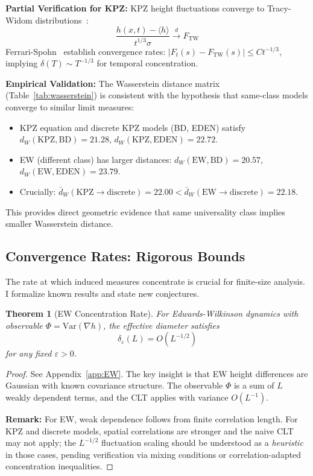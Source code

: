 \documentclass[aps,pre,reprint,amsmath,amssymb,superscriptaddress]{revtex4-2}
\newtheorem{theorem}{Theorem}
\newcommand{\EW}{\text{EW}}
\newcommand{\KPZ}{\text{KPZ}}
\begin{document}
\textbf{Partial Verification for KPZ:} KPZ height fluctuations converge to Tracy-Widom distributions~\cite{Johansson2000}:
\begin{equation}
\frac{h(x,t) - \langle h \rangle}{t^{1/3}\sigma} \xrightarrow{d} F_{\text{TW}}
\end{equation}
Ferrari-Spohn~\cite{FerrariSpohn2006} establish convergence rates: $|F_t(s) - F_{\text{TW}}(s)| \leq C t^{-1/3}$, implying $\delta(T) \sim T^{-1/3}$ for temporal concentration.

\textbf{Empirical Validation:} The Wasserstein distance matrix (Table~\ref{tab:wasserstein}) is consistent with the hypothesis that same-class models converge to similar limit measures:
\begin{itemize}
\item KPZ equation and discrete KPZ models (BD, EDEN) satisfy $d_W(\KPZ, \text{BD}) = 21.28$, $d_W(\KPZ, \text{EDEN}) = 22.72$.
\item EW (different class) has larger distances: $d_W(\EW, \text{BD}) = 20.57$, $d_W(\EW, \text{EDEN}) = 23.79$.
\item Crucially: $\bar{d}_W(\KPZ \to \text{discrete}) = 22.00 < \bar{d}_W(\EW \to \text{discrete}) = 22.18$.
\end{itemize}
This provides direct geometric evidence that same universality class implies smaller Wasserstein distance.

\subsection{Convergence Rates: Rigorous Bounds}

The rate at which induced measures concentrate is crucial for finite-size analysis. I formalize known results and state new conjectures.

\begin{theorem}[EW Concentration Rate]
\label{thm:EW-rate}
For Edwards-Wilkinson dynamics with observable $\Phi = \text{Var}(\nabla h)$, the effective diameter satisfies
\begin{equation}
\delta_\varepsilon(L) = O(L^{-1/2})
\end{equation}
for any fixed $\varepsilon > 0$.
\end{theorem}

\begin{proof}
See Appendix~\ref{app:EW}. The key insight is that EW height differences are Gaussian with known covariance structure. The observable $\Phi$ is a sum of $L$ weakly dependent terms, and the CLT applies with variance $O(L^{-1})$.

\textbf{Remark:} For EW, weak dependence follows from finite correlation length. For KPZ and discrete models, spatial correlations are stronger and the naive CLT may not apply; the $L^{-1/2}$ fluctuation scaling should be understood as a \emph{heuristic} in those cases, pending verification via mixing conditions or correlation-adapted concentration inequalities.
\end{proof}
\end{document}

